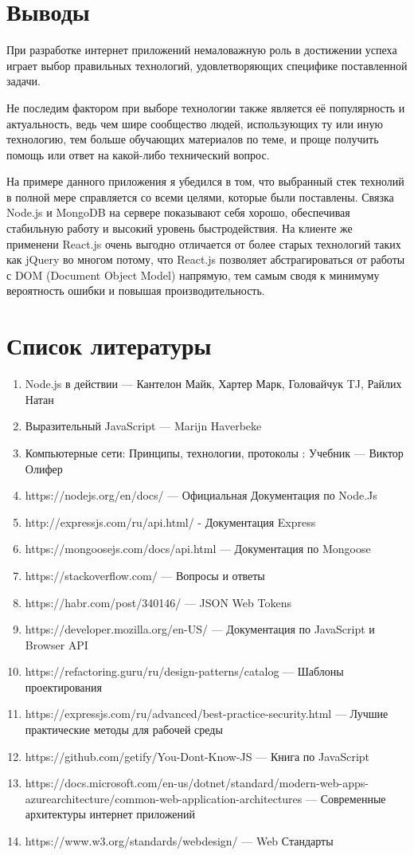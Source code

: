 \documentclass[12pt]{article}
\begin{document}
\section*{Выводы}
При разработке интернет приложений немаловажную роль в достижении успеха играет выбор
правильных технологий, удовлетворяющих специфике поставленной задачи.

Не последим фактором при выборе технологии также является её популярность и
актуальность, ведь чем шире сообщество людей, использующих ту или иную технологию, тем
больше обучающих материалов по теме, и проще получить помощь или ответ на какой-либо
технический вопрос.

На примере данного приложения я убедился в том, что выбранный стек технолий в полной
мере справляется со всеми целями, которые были поставлены. Связка Node.js и MongoDB на
сервере показывают себя хорошо, обеспечивая стабильную работу и высокий уровень
быстродействия. На клиенте же применени React.js очень выгодно отличается от более старых
технологий таких как jQuery во многом потому, что React.js позволяет абстрагироваться от работы
с DOM (Document Object Model) напрямую, тем самым сводя к минимуму вероятность ошибки и
повышая производительность. 
\section*{Список литературы}
\begin{enumerate}
\item Node.js в действии --- Кантелон Майк, Хартер Марк, Головайчук TJ, Райлих Натан
\item Выразительный JavaScript --- Marijn Haverbeke
\item Компьютерные сети: Принципы, технологии, протоколы : Учебник --- Виктор Олифер
\item https://nodejs.org/en/docs/ --- Официальная Документация по Node.Js
\item http://expressjs.com/ru/api.html/ - Документация Express
\item https://mongoosejs.com/docs/api.html --- Документация по Mongoose
\item https://stackoverflow.com/ --- Вопросы и ответы
\item https://habr.com/post/340146/ --- JSON Web Tokens
\item https://developer.mozilla.org/en-US/ --- Документация по JavaScript и Browser API
\item https://refactoring.guru/ru/design-patterns/catalog --- Шаблоны проектирования
\item https://expressjs.com/ru/advanced/best-practice-security.html --- Лучшие практические методы для рабочей среды
\item https://github.com/getify/You-Dont-Know-JS --- Книга по JavaScript
\item https://docs.microsoft.com/en-us/dotnet/standard/modern-web-apps-azurearchitecture/common-web-application-architectures --- Современные архитектуры интернет приложений
\item https://www.w3.org/standards/webdesign/ --- Web Стандарты

\end{enumerate}
\end{document}
